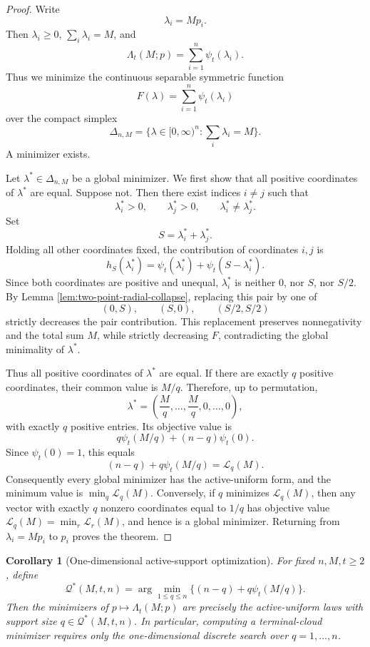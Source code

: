 \documentclass[11pt]{article}
\newtheorem{corollary}{Corollary}
\theoremstyle{definition}
\theoremstyle{remark}
\newcommand{\1}{\mathbf 1}
\begin{document}
\begin{proof}
Write
\[
  \lambda_i=Mp_i.
\]
Then \(\lambda_i\ge0\), \(\sum_i\lambda_i=M\), and
\[
  \Lambda_t(M;p)=\sum_{i=1}^n\psi_t(\lambda_i).
\]
Thus we minimize the continuous separable symmetric function
\[
  F(\lambda)=\sum_{i=1}^n\psi_t(\lambda_i)
\]
over the compact simplex
\[
  \Delta_{n,M}=\{\lambda\in[0,\infty)^n:\sum_i\lambda_i=M\}.
\]
A minimizer exists.

Let \(\lambda^*\in\Delta_{n,M}\) be a global minimizer.  We first show that all positive coordinates of \(\lambda^*\) are equal.  Suppose not.  Then there exist indices \(i\ne j\) such that
\[
  \lambda_i^*>0,
  \qquad
  \lambda_j^*>0,
  \qquad
  \lambda_i^*\ne\lambda_j^*.
\]
Set
\[
  S=\lambda_i^*+\lambda_j^*.
\]
Holding all other coordinates fixed, the contribution of coordinates \(i,j\) is
\[
  h_S(\lambda_i^*)=\psi_t(\lambda_i^*)+\psi_t(S-\lambda_i^*).
\]
Since both coordinates are positive and unequal, \(\lambda_i^*\) is neither \(0\), nor \(S\), nor \(S/2\).  By Lemma \ref{lem:two-point-radial-collapse}, replacing this pair by one of
\[
  (0,S),\qquad (S,0),\qquad (S/2,S/2)
\]
strictly decreases the pair contribution.  This replacement preserves nonnegativity and the total sum \(M\), while strictly decreasing \(F\), contradicting the global minimality of \(\lambda^*\).

Thus all positive coordinates of \(\lambda^*\) are equal.  If there are exactly \(q\) positive coordinates, their common value is \(M/q\).  Therefore, up to permutation,
\[
  \lambda^*=\left(\frac{M}{q},\ldots,\frac{M}{q},0,\ldots,0\right),
\]
with exactly \(q\) positive entries.  Its objective value is
\[
  q\psi_t(M/q)+(n-q)\psi_t(0).
\]
Since \(\psi_t(0)=1\), this equals
\[
  (n-q)+q\psi_t(M/q)=\mathcal L_q(M).
\]
Consequently every global minimizer has the active-uniform form, and the minimum value is \(\min_q \mathcal L_q(M)\).  Conversely, if \(q\) minimizes \(\mathcal L_q(M)\), then any vector with exactly \(q\) nonzero coordinates equal to \(1/q\) has objective value \(\mathcal L_q(M)=\min_r \mathcal L_r(M)\), and hence is a global minimizer.  Returning from \(\lambda_i=Mp_i\) to \(p_i\) proves the theorem.
\end{proof}

\begin{corollary}[One-dimensional active-support optimization]\label{cor:q-optimization}
For fixed \(n,M,t\ge2\), define
\[
  \mathcal Q^*(M,t,n)=\arg\min_{1\le q\le n}\bigl\{(n-q)+q\psi_t(M/q)\bigr\}.
\]
Then the minimizers of \(p\mapsto\Lambda_t(M;p)\) are precisely the active-uniform laws with support size \(q\in\mathcal Q^*(M,t,n)\).  In particular, computing a terminal-cloud minimizer requires only the one-dimensional discrete search over \(q=1,\ldots,n\).
\end{corollary}
\end{document}
